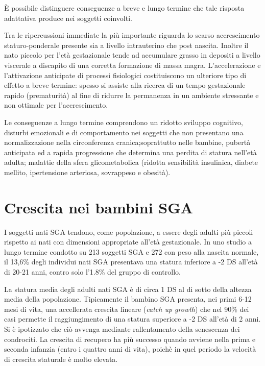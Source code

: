 \`E possibile distinguere conseguenze a breve e lungo termine che tale risposta
adattativa produce nei soggetti coinvolti.

Tra le ripercussioni immediate la più importante riguarda lo scarso accrescimento
staturo-ponderale presente sia a livello intrauterino che post nascita. Inoltre 
il nato piccolo per l'età gestazionale tende ad accumulare grasso in depositi a livello
viscerale a discapito di una corretta formazione di massa magra. L'accelerazione e 
l'attivazione anticipate di processi fisiologici costituiscono un ulteriore tipo di 
effetto a breve termine: spesso si assiste alla ricerca di un tempo gestazionale
rapido (prematurità) al fine di ridurre la permanenza in un ambiente stressante
e non ottimale per l'accrescimento.\cite{sga-53}

Le conseguenze a lungo termine comprendono un ridotto sviluppo cognitivo, disturbi emozionali e di comportamento nei 
soggetti che non presentano una normalizzazione nella circonferenza cranica;soprattutto nelle bambine, pubertà 
anticipata ed a rapida progressione  che determina una perdita di 
statura nell'età adulta; malattie della sfera glicometabolica (ridotta sensibilità insulinica, diabete mellito,
ipertensione arteriosa, sovrappeso e obesità).\cite{sga-32}


\section{Crescita nei bambini SGA}

I soggetti nati SGA tendono, come popolazione, a essere degli adulti più piccoli
rispetto ai nati con dimensioni appropriate all'età gestazionale. In uno studio
a lungo termine condotto su 213 soggetti SGA e 272 con peso alla nascita normale, il 
13,6\% degli individui nati SGA presentava una statura inferiore a -2 DS all'età di
20-21 anni, contro solo l'1.8\% del gruppo di controllo.\cite{leger1997reduced}

La statura media degli adulti nati SGA è di circa 1 DS al di sotto della altezza 
media della popolazione. Tipicamente il bambino SGA presenta, nei primi 6-12 mesi
di vita, una accellerata crescita lineare (\textit{catch up growth}) che nel 90\%
dei casi permette il raggiungimento di una statura superiore a -2 DS all'età di
2 anni\cite{karlberg1995growth}.
Si è ipotizzato che ciò avvenga mediante rallentamento della senescenza dei condrociti.\cite{gafni2001catch}
La crescita di recupero ha più successo quando avviene nella prima e seconda infanzia (entro i quattro anni di vita), poichè in quel periodo la velocità di crescita staturale è molto elevata. %

